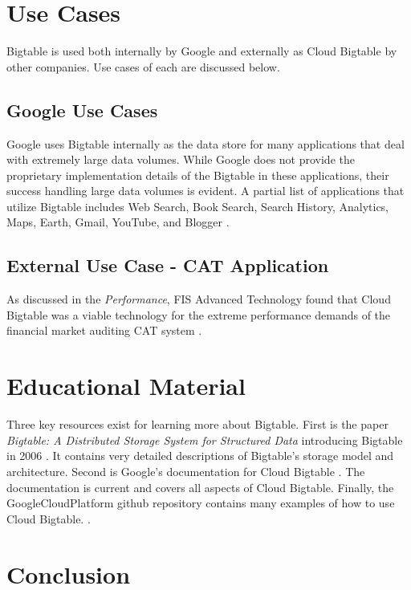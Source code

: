 \documentclass[9pt,twocolumn,twoside]{styles/osajnl}
\begin{document}
\section{Use Cases}

Bigtable is used both internally by Google and externally as Cloud Bigtable by other companies.  Use cases of each are discussed below.

\subsection{Google Use Cases}

Google uses Bigtable internally as the data store for many applications that deal with extremely large data volumes. While Google does not provide the proprietary implementation details of the Bigtable in these applications, their success handling large data volumes is evident.  A partial list of applications that utilize Bigtable includes Web Search, Book Search, Search History, Analytics, Maps, Earth, Gmail, YouTube, and Blogger \cite{www-wikibigtable}.


\subsection{External Use Case - CAT Application}

As discussed in the \emph{Performance}, FIS Advanced Technology found that Cloud Bigtable was a viable technology for the extreme performance demands of the financial market auditing CAT system \cite{www-fis}.

\section{Educational Material}

Three key resources exist for learning more about Bigtable. First is the paper \emph{Bigtable: A Distributed Storage System for Structured Data} introducing Bigtable in 2006 \cite{introbigtable}.  It contains very detailed descriptions of Bigtable's storage model and architecture. Second is Google's documentation for Cloud Bigtable \cite{www-bigtabledocumentation}.  The documentation is current and covers all aspects of Cloud Bigtable. Finally, the GoogleCloudPlatform github repository contains many examples of how to use Cloud Bigtable. \cite{git-googlecloud}.

\section{Conclusion}
\end{document}
